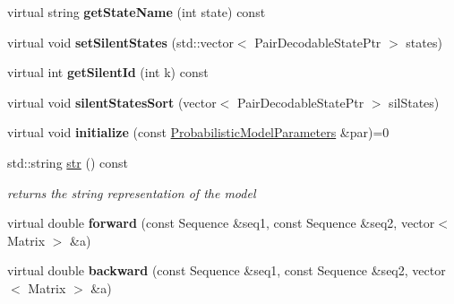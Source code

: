 \begin{DoxyCompactItemize}
virtual string {\bfseries get\+State\+Name} (int state) const
\item 
\mbox{\label{classtops_1_1PairDecodableModel_a3505ecdf567b392edb700d8734aa1baa}} 
virtual void {\bfseries set\+Silent\+States} (std\+::vector$<$ Pair\+Decodable\+State\+Ptr $>$ states)
\item 
\mbox{\label{classtops_1_1PairDecodableModel_a19496eec82806c981dc0b99be9b4f37c}} 
virtual int {\bfseries get\+Silent\+Id} (int k) const
\item 
\mbox{\label{classtops_1_1PairDecodableModel_abe4456add4701b0f5a3ea0a32cb66c2b}} 
virtual void {\bfseries silent\+States\+Sort} (vector$<$ Pair\+Decodable\+State\+Ptr $>$ sil\+States)
\item 
\mbox{\label{classtops_1_1PairDecodableModel_a53161986d61af00fadeed4043366077c}} 
virtual void {\bfseries initialize} (const \hyperlink{classtops_1_1ProbabilisticModelParameters}{Probabilistic\+Model\+Parameters} \&par)=0
\item 
\mbox{\label{classtops_1_1PairDecodableModel_a17f808a62358881d82768c944f4c47b0}} 
std\+::string \hyperlink{classtops_1_1PairDecodableModel_a17f808a62358881d82768c944f4c47b0}{str} () const
\begin{DoxyCompactList}\small\item\em returns the string representation of the model \end{DoxyCompactList}\item 
\mbox{\label{classtops_1_1PairDecodableModel_acdcde5c8ea2140727caa660a9957ac98}} 
virtual double {\bfseries forward} (const Sequence \&seq1, const Sequence \&seq2, vector$<$ Matrix $>$ \&a)
\item 
\mbox{\label{classtops_1_1PairDecodableModel_a34b0940267a5bb8506eea8608f3b0e4b}} 
virtual double {\bfseries backward} (const Sequence \&seq1, const Sequence \&seq2, vector$<$ Matrix $>$ \&a)
\item 
\mbox{\label{classtops_1_1PairDecodableModel_a0f6960d373d1f6bed91e860a36d7eee9}} 

\end{DoxyCompactItemize}
